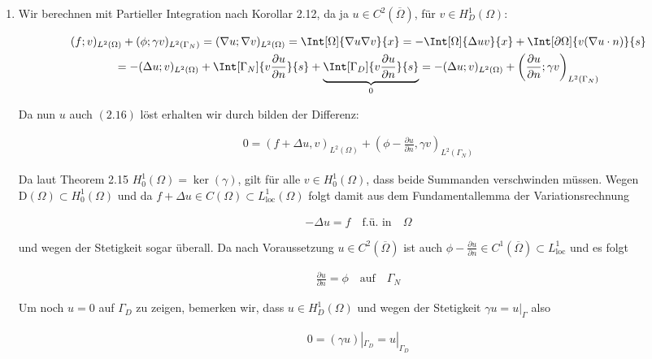 \begin{solution}
\begin{enumerate}[label = (\roman*)]
    \item Wir berechnen mit Partieller Integration nach Korollar 2.12, da ja $u \in C^2(\overline{\Omega})$, für $v \in H_D^1(\Omega)$:

    \begin{multline*}
      (f;v)_{L^2(\Omega)} + (\phi;\gamma v)_{L^2(\Gamma_N)} = (\nabla u; \nabla v)_{L^2(\Omega)}
      =
      \Int[\Omega]{\nabla u \nabla v}{x}
      =
      -\Int[\Omega]{\Delta u v}{x} + \Int[\partial \Omega]{v(\nabla u \cdot n)}{s} \\
      =
      -(\Delta u; v)_{L^2(\Omega)}
      + \Int[\Gamma_N]{v \frac{\partial u}{\partial n}}{s}
      + \underbrace{\Int[\Gamma_D]{v \frac{\partial u}{\partial n}}{s}}_{0}
      =
      -(\Delta u; v)_{L^2(\Omega)} + \left(\frac{\partial u}{\partial n}; \gamma v\right)_{L^2(\Gamma_N)}
    \end{multline*}

    Da nun $u$ auch $(2.16)$ löst erhalten wir durch bilden der Differenz:

    \begin{align*}
      0 = (f + \Delta u, v)_{L^2(\Omega)} + (\phi - \frac{\partial u}{\partial n}, \gamma v)_{L^2(\Gamma_N)}
    \end{align*}

    Da laut Theorem 2.15 $H_0^1(\Omega) = \ker(\gamma)$, gilt für alle $v \in H_0^1(\Omega)$,
    dass beide Summanden verschwinden müssen.
    Wegen $\mathrm{D}(\Omega) \subset H^1_0(\Omega)$ und da $f + \Delta u \in C(\Omega) \subset L^1_{\mathrm{loc}}(\Omega)$ folgt damit aus dem Fundamentallemma der Variationsrechnung

    \begin{align*}
        -\Delta u = f \quad \text {f.ü. in} \quad \Omega
    \end{align*}

    und wegen der Stetigkeit sogar überall.
    Da nach Voraussetzung $u  \in C^2(\overline{\Omega})$ ist auch $\phi - \frac{\partial u}{\partial n}
    \in C^1(\overline{\Omega}) \subset L^1_{\mathrm{loc}}$ und es folgt

    \begin{align*}
      \frac{\partial u}{\partial n} = \phi \quad \text{auf} \quad \Gamma_N
    \end{align*}

    Um noch $u = 0$ auf $\Gamma_D$ zu zeigen, bemerken wir, dass $u \in H^1_D(\Omega)$ und wegen der Stetigkeit $\gamma u = u|_{\Gamma}$ also

    \begin{align*}
      0 = (\gamma u)|_{\Gamma_D} = u|_{\Gamma_D}
    \end{align*}
\end{enumerate}

\end{solution}

